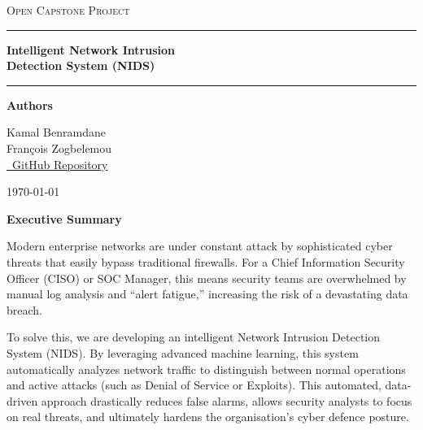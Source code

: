 \documentclass[12pt, a4paper]{article}
\begin{document}
\begin{titlepage}
    \centering
    \vspace*{2cm}

    {\large\scshape Open Capstone Project \par}
    \vspace{0.5cm}
    \rule{\linewidth}{0.4pt}
    \vspace{0.5cm}

    {\Huge\bfseries Intelligent Network Intrusion\\[0.3em]
    Detection System (NIDS) \par}

    \vspace{0.5cm}
    \rule{\linewidth}{0.4pt}
    \vspace{2cm}

    {\large\bfseries Authors \par}
    \vspace{0.4cm}
    {\large
        Kamal Benramdane \\[0.3em]
        François Zogbelemou \\[0.8em]
        \href{https://github.com/chokonutsXK/dataScience_project}{\faGithub\ GitHub Repository}
    \par}

    \vfill

    {\large \today \par}
\end{titlepage}

\newpage
{}              %

\begin{center}
    {\Large\bfseries Executive Summary}
\end{center}
\vspace{0.5em}
\noindent
Modern enterprise networks are under constant attack by sophisticated cyber
threats that easily bypass traditional firewalls. For a Chief Information
Security Officer (CISO) or SOC Manager, this means security teams are
overwhelmed by manual log analysis and ``alert fatigue,'' increasing the
risk of a devastating data breach.

\medskip\noindent
To solve this, we are developing an intelligent Network Intrusion Detection
System (NIDS). By leveraging advanced machine learning, this system
automatically analyzes network traffic to distinguish between normal
operations and active attacks (such as Denial of Service or Exploits).
This automated, data-driven approach drastically reduces false alarms,
allows security analysts to focus on real threats, and ultimately hardens
the organisation's cyber defence posture.
\end{document}
